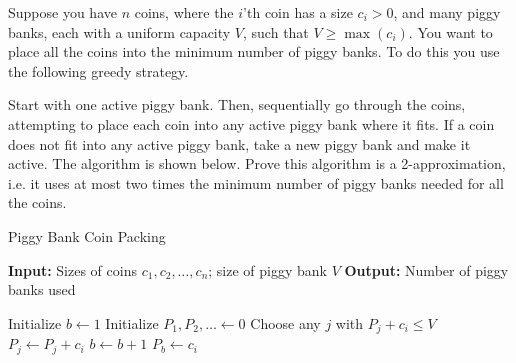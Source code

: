 \problem{}
Suppose you have $n$ coins, where the $i$'th coin has a size $c_i > 0$, and many piggy banks, each with a uniform capacity \(V\), such that \(V \geq \max(c_i)\).  You want to place all the coins into the minimum number of piggy banks.  To do this you use the following greedy strategy.

Start with one active piggy bank.  Then, sequentially go through the coins, attempting to place each coin into any active piggy bank where it fits. If a coin does not fit into any active piggy bank, take a new piggy bank and make it active.  The algorithm is shown below.  Prove this algorithm is a 2-approximation, i.e. it uses at most two times the minimum number of piggy banks needed for all the coins.

\begin{algorithm}
\caption{Piggy Bank Coin Packing}
\begin{algorithmic}[1]
\State \textbf{Input:} Sizes of coins \(c_1, c_2, \ldots, c_n\); size of piggy bank \(V\)
\State \textbf{Output:} Number of piggy banks used

\State Initialize \(b \leftarrow 1\) 
\State Initialize \(P_1, P_2, \ldots \leftarrow 0\) 
        \State Choose any \(j\) with \(P_j + c_i \leq V\)
        \State \(P_j \leftarrow P_j + c_i\) 
    \Else
        \State \(b \leftarrow b + 1\)
        \State \(P_b \leftarrow c_i\) 
    \EndIf
\EndFor
\end{algorithmic}
\end{algorithm}

\solution{}










\newpage
